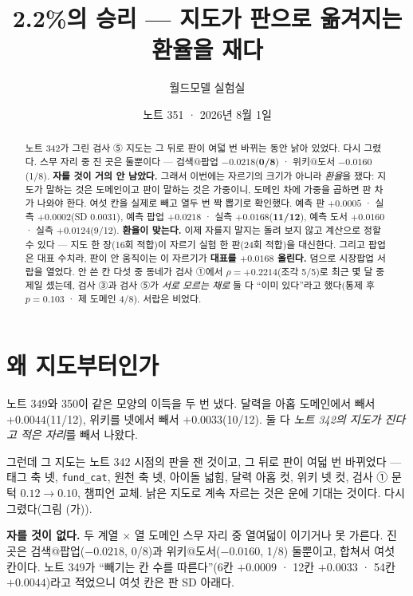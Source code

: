 \documentclass[11pt]{article}
\begin{document}
\title{2.2\%의 승리 --- 지도가 판으로 옮겨지는 환율을 재다}
\author{월드모델 실험실}
\date{노트 351 · 2026년 8월 1일}
\maketitle

\begin{abstract}
노트 342가 그린 검사 ⑤ 지도는 그 뒤로 판이 여덟 번 바뀌는 동안 낡아
있었다. 다시 그렸다. 스무 자리 중 진 곳은 둘뿐이다 --- 검색@팝업
$-0.0218$(\textbf{0/8}) · 위키@도서 $-0.0160$(1/8). \textbf{자를 것이
거의 안 남았다.} 그래서 이번에는 자르기의 크기가 아니라 \emph{환율}을
쟀다: 지도가 말하는 것은 도메인이고 판이 말하는 것은 가중이니, 도메인
차에 가중을 곱하면 판 차가 나와야 한다. 여섯 칸을 실제로 빼고 열두 번
짝 뽑기로 확인했다. 예측 판 $+0.0005$ · 실측 $+0.0002$(SD 0.0031),
예측 팝업 $+0.0218$ · 실측 $+0.0168$(\textbf{11/12}), 예측 도서
$+0.0160$ · 실측 $+0.0124$(9/12). \textbf{환율이 맞는다.} 이제 자를지
말지는 돌려 보지 않고 계산으로 정할 수 있다 --- 지도 한 장(16회 적합)이
자르기 실험 한 판(24회 적합)을 대신한다. 그리고 팝업은 대표 수치라,
판이 안 움직이는 이 자르기가 \textbf{대표를 $+0.0168$ 올린다.}
덤으로 시장팝업 서랍을 열었다. 안 쓴 칸 다섯 중 동네가 검사 ①에서
$\rho=+0.2214$(조각 5/5)로 최근 몇 달 중 제일 셌는데, 검사 ③과 검사
⑤가 \emph{서로 모르는 채로} 둘 다 ``이미 있다''라고 했다(통제 후
$p=0.103$ · 제 도메인 4/8). 서랍은 비었다.
\end{abstract}

\section{왜 지도부터인가}

노트 349와 350이 같은 모양의 이득을 두 번 냈다. 달력을 아홉 도메인에서
빼서 $+0.0044$(11/12), 위키를 넷에서 빼서 $+0.0033$(10/12). 둘 다
\emph{노트 342의 지도가 진다고 적은 자리}를 빼서 나왔다.

그런데 그 지도는 노트 342 시점의 판을 잰 것이고, 그 뒤로 판이 여덟 번
바뀌었다 --- 태그 축 넷, \texttt{fund\_cat}, 원천 축 넷, 아이돌 넓힘,
달력 아홉 컷, 위키 넷 컷, 검사 ① 문턱 $0.12\to0.10$, 챔피언 교체.
낡은 지도로 계속 자르는 것은 운에 기대는 것이다. 다시 그렸다(그림 (가)).

\textbf{자를 것이 없다.} 두 계열 $\times$ 열 도메인 스무 자리 중 열여덟이
이기거나 못 가른다. 진 곳은 검색@팝업($-0.0218$, 0/8)과
위키@도서($-0.0160$, 1/8) 둘뿐이고, 합쳐서 여섯 칸이다. 노트 349가
``빼기는 칸 수를 따른다''(6칸 $+0.0009$ · 12칸 $+0.0033$ · 54칸
$+0.0044$)라고 적었으니 여섯 칸은 판 SD 아래다.
\end{document}
